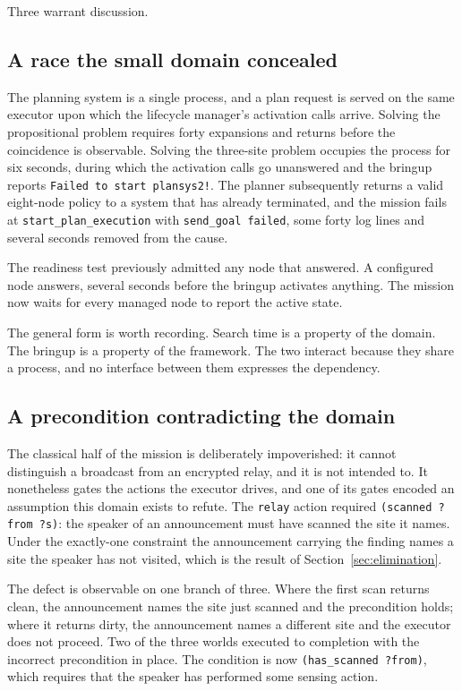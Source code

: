 \documentclass[11pt,a4paper]{article}
\theoremstyle{definition}
\newcommand{\code}[1]{\texttt{\small #1}}
\begin{document}
Three warrant discussion.

\subsection{A race the small domain concealed}

The planning system is a single process, and a plan request is served on the
same executor upon which the lifecycle manager's activation calls arrive.
Solving the propositional problem requires forty expansions and returns before
the coincidence is observable. Solving the three-site problem occupies the
process for six seconds, during which the activation calls go unanswered and
the bringup reports \code{Failed to start plansys2!}. The planner subsequently
returns a valid eight-node policy to a system that has already terminated, and
the mission fails at \code{start\_plan\_execution} with \code{send\_goal
failed}, some forty log lines and several seconds removed from the cause.

The readiness test previously admitted any node that answered. A configured
node answers, several seconds before the bringup activates anything. The
mission now waits for every managed node to report the active state.

The general form is worth recording. Search time is a property of the domain.
The bringup is a property of the framework. The two interact because they share
a process, and no interface between them expresses the dependency.

\subsection{A precondition contradicting the domain}

The classical half of the mission is deliberately impoverished: it cannot
distinguish a broadcast from an encrypted relay, and it is not intended to.
It nonetheless gates the actions the executor drives, and one of its gates
encoded an assumption this domain exists to refute. The \code{relay} action
required \code{(scanned ?from ?s)}: the speaker of an announcement must have
scanned the site it names. Under the exactly-one constraint the announcement
carrying the finding names a site the speaker has not visited, which is the
result of Section~\ref{sec:elimination}.

The defect is observable on one branch of three. Where the first scan returns
clean, the announcement names the site just scanned and the precondition holds;
where it returns dirty, the announcement names a different site and the
executor does not proceed. Two of the three worlds executed to completion with
the incorrect precondition in place. The condition is now
\code{(has\_scanned ?from)}, which requires that the speaker has performed some
sensing action.
\end{document}
